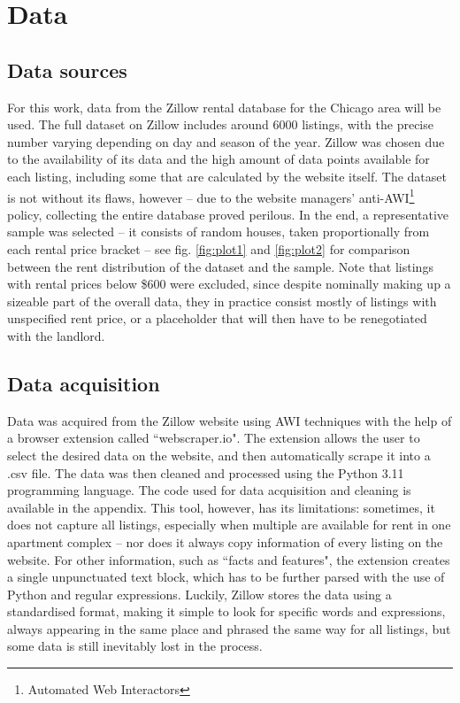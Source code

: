\documentclass[12pt]{report}
\begin{document}
\section{Data}

\subsection{Data sources}

For this work, data from the Zillow rental database for the Chicago area will be used. The full dataset on Zillow includes around 6000 listings, with the precise number varying depending on day and season of the year. Zillow was chosen due to the availability of its data and the high amount of data points available for each listing, including some that are calculated by the website itself. The dataset is not without its flaws, however -- due to the website managers' anti-AWI\footnote{Automated Web Interactors} policy, collecting the entire database proved perilous. In the end, a representative sample was selected -- it consists of random houses, taken proportionally from each rental price bracket -- see fig. \ref{fig:plot1} and \ref{fig:plot2} for comparison between the rent distribution of the dataset and the sample. Note that listings with rental prices below \$600 were excluded, since despite nominally making up a sizeable part of the overall data, they in practice consist mostly of listings with unspecified rent price, or a placeholder that will then have to be renegotiated with the landlord.

\subsection{Data acquisition}
Data was acquired from the Zillow website using AWI techniques with the help of a browser extension called ``webscraper.io". The extension allows the user to select the desired data on the website, and then automatically scrape it into a .csv file. The data was then cleaned and processed using the Python 3.11 programming language. The code used for data acquisition and cleaning is available in the appendix. This tool, however, has its limitations: sometimes, it does not capture all listings, especially when multiple are available for rent in one apartment complex -- nor does it always copy information of every listing on the website. For other information, such as ``facts and features", the extension creates a single unpunctuated text block, which has to be further parsed with the use of Python and regular expressions. Luckily, Zillow stores the data using a standardised format, making it simple to look for specific words and expressions, always appearing in the same place and phrased the same way for all listings, but some data is still inevitably lost in the process.
\end{document}
